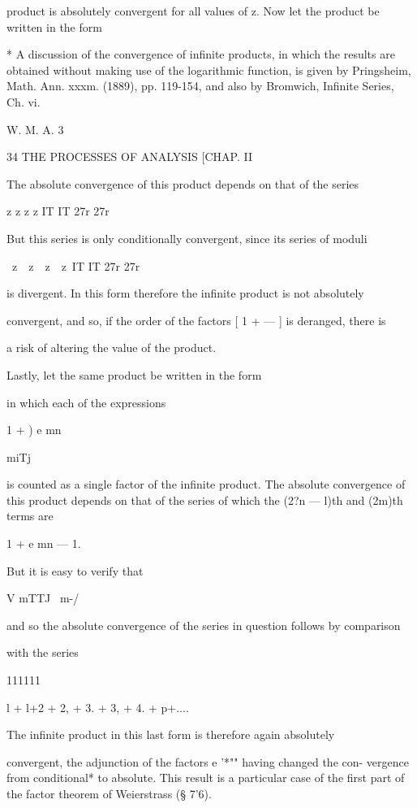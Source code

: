 product is absolutely convergent for all values of z. Now let the
product be written in the form

* A discussion of the convergence of infinite products, in which the
results are obtained without making use of the logarithmic function,
is given by Pringsheim, Math. Ann. xxxm. (1889), pp. 119-154, and also
by Bromwich, Infinite Series, Ch. vi.

W. M. A. 3



34 THE PROCESSES OF ANALYSIS [CHAP. II

The absolute convergence of this product depends on that of the series



z z z z IT IT 27r 27r



But this series is only conditionally convergent, since its series of
moduli

\ z\ \ z\ \ z\ \ z\ IT IT 27r 27r

is divergent. In this form therefore the infinite product is not
absolutely

convergent, and so, if the order of the factors [ 1 + — ] is deranged,
there is

a risk of altering the value of the product.

Lastly, let the same product be written in the form

in which each of the expressions



1 + ) e mn

miTj



is counted as a single factor of the infinite product. The absolute
convergence of this product depends on that of the series of which the
(2?n — l)th and (2m)th terms are

1 + e mn — 1.

But it is easy to verify that

V mTTJ \ m-/

and so the absolute convergence of the series in question follows by
comparison

with the series

111111

l + l+2 + 2, + 3. + 3, + 4. + p+....

The infinite product in this last form is therefore again absolutely

convergent, the adjunction of the factors e '*"" having changed the
con- vergence from conditional* to absolute. This result is a
particular case of the first part of the factor theorem of Weierstrass
(§ 7'6).

